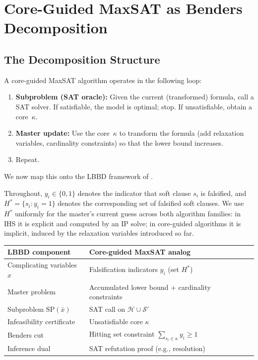 \documentclass[11pt,a4paper]{article}
\begin{document}
\section{Core-Guided MaxSAT as Benders Decomposition}
\label{sec:benders}

\subsection{The Decomposition Structure}

A core-guided MaxSAT algorithm operates in the following loop:
\begin{enumerate}
\item \textbf{Subproblem (SAT oracle):} Given the current (transformed) formula, call a SAT solver. If satisfiable, the model is optimal; stop. If unsatisfiable, obtain a core~$\kappa$.
\item \textbf{Master update:} Use the core~$\kappa$ to transform the formula (add relaxation variables, cardinality constraints) so that the lower bound increases.
\item Repeat.
\end{enumerate}

We now map this onto the LBBD framework of \citet{hooker2003logic}.

Throughout, $y_i \in \{0,1\}$ denotes the indicator that soft clause $s_i$ is
falsified, and $H^* = \{s_i : y_i = 1\}$ denotes the corresponding set of
falsified soft clauses. We use $H^*$ uniformly for the master's current
guess across both algorithm families: in IHS it is explicit and computed by an
IP solve; in core-guided algorithms it is implicit, induced by the relaxation
variables introduced so far.

\begin{center}
\begin{tabular}{lll}
\toprule
\textbf{LBBD component} & \textbf{Core-guided MaxSAT analog} \\
\midrule
Complicating variables $x$ & Falsification indicators $y_i$ (set $H^*$) \\
Master problem & Accumulated lower bound + cardinality constraints \\
Subproblem $\mathrm{SP}(\bar{x})$ & SAT call on $\mathcal{H} \cup \mathcal{S}'$ \\
Infeasibility certificate & Unsatisfiable core $\kappa$ \\
Benders cut & Hitting set constraint $\sum_{s_i \in \kappa} y_i \geq 1$ \\
Inference dual & SAT refutation proof (e.g., resolution) \\
\bottomrule
\end{tabular}
\end{center}
\end{document}
